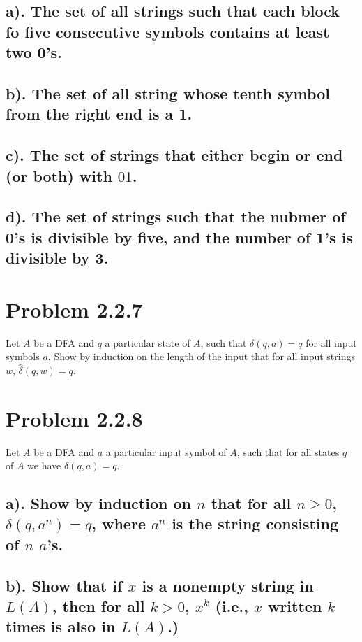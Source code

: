 \documentclass[20pt]{article} %
\begin{document}
\subsection{a). The set of all strings such that each block fo five consecutive symbols contains at least two 0's.}

\subsection{b). The set of all string whose tenth symbol from the right end is a 1.}

\subsection{c). The set of strings that either begin or end (or both) with $01$.}

\subsection{d). The set of strings such that the nubmer of 0's is divisible by five, and the number of 1's is divisible by 3.}

\section{Problem 2.2.7}
Let $A$ be a DFA and $q$ a particular state of $A$, such that $\delta(q,a)=q$ for all input symbols $a$. 
Show by induction on the length of the input that for all input strings $w$, $\hat{\delta}(q,w)=q$.

\section{Problem 2.2.8}
Let $A$ be a DFA and $a$ a particular input symbol of $A$, such that for all states $q$ of $A$ we have $\delta(q,a)=q$.

\subsection{a). Show by induction on $n$ that for all $n\geq0$, $\delta(q,a^{n})=q$, where $a^{n}$ is the string consisting of $n$ $a$'s.}

\subsection{b). Show that if $x$ is a nonempty string in $L(A)$, then for all $k>0$, $x^{k}$ (i.e., $x$ written $k$ times is also in $L(A)$.)}
\end{document}
